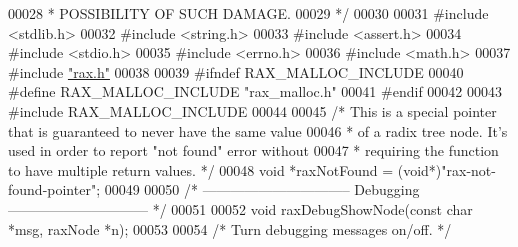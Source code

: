 \begin{DoxyCode}
00028 \textcolor{comment}{ * POSSIBILITY OF SUCH DAMAGE.}
00029 \textcolor{comment}{ */}
00030 
00031 \textcolor{preprocessor}{#}\textcolor{preprocessor}{include} \textcolor{preprocessor}{<}\textcolor{preprocessor}{stdlib}\textcolor{preprocessor}{.}\textcolor{preprocessor}{h}\textcolor{preprocessor}{>}
00032 \textcolor{preprocessor}{#}\textcolor{preprocessor}{include} \textcolor{preprocessor}{<}\textcolor{preprocessor}{string}\textcolor{preprocessor}{.}\textcolor{preprocessor}{h}\textcolor{preprocessor}{>}
00033 \textcolor{preprocessor}{#}\textcolor{preprocessor}{include} \textcolor{preprocessor}{<}\textcolor{preprocessor}{assert}\textcolor{preprocessor}{.}\textcolor{preprocessor}{h}\textcolor{preprocessor}{>}
00034 \textcolor{preprocessor}{#}\textcolor{preprocessor}{include} \textcolor{preprocessor}{<}\textcolor{preprocessor}{stdio}\textcolor{preprocessor}{.}\textcolor{preprocessor}{h}\textcolor{preprocessor}{>}
00035 \textcolor{preprocessor}{#}\textcolor{preprocessor}{include} \textcolor{preprocessor}{<}\textcolor{preprocessor}{errno}\textcolor{preprocessor}{.}\textcolor{preprocessor}{h}\textcolor{preprocessor}{>}
00036 \textcolor{preprocessor}{#}\textcolor{preprocessor}{include} \textcolor{preprocessor}{<}\textcolor{preprocessor}{math}\textcolor{preprocessor}{.}\textcolor{preprocessor}{h}\textcolor{preprocessor}{>}
00037 \textcolor{preprocessor}{#}\textcolor{preprocessor}{include} \hyperlink{rax_8h}{"rax.h"}
00038 
00039 \textcolor{preprocessor}{#}\textcolor{preprocessor}{ifndef} \textcolor{preprocessor}{RAX\_MALLOC\_INCLUDE}
00040 \textcolor{preprocessor}{#}\textcolor{preprocessor}{define} \textcolor{preprocessor}{RAX\_MALLOC\_INCLUDE} \textcolor{stringliteral}{"rax\_malloc.h"}
00041 \textcolor{preprocessor}{#}\textcolor{preprocessor}{endif}
00042 
00043 \textcolor{preprocessor}{#}\textcolor{preprocessor}{include} \textcolor{preprocessor}{RAX\_MALLOC\_INCLUDE}
00044 
00045 \textcolor{comment}{/* This is a special pointer that is guaranteed to never have the same value}
00046 \textcolor{comment}{ * of a radix tree node. It's used in order to report "not found" error without}
00047 \textcolor{comment}{ * requiring the function to have multiple return values. */}
00048 \textcolor{keywordtype}{void} *raxNotFound = (\textcolor{keywordtype}{void}*)\textcolor{stringliteral}{"rax-not-found-pointer"};
00049 
00050 \textcolor{comment}{/* -------------------------------- Debugging ------------------------------ */}
00051 
00052 \textcolor{keywordtype}{void} raxDebugShowNode(\textcolor{keyword}{const} \textcolor{keywordtype}{char} *msg, raxNode *n);
00053 
00054 \textcolor{comment}{/* Turn debugging messages on/off. */}

\end{DoxyCode}
